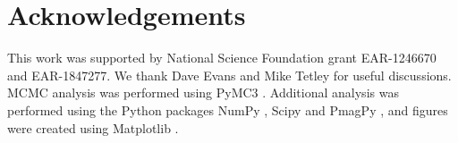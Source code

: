 \documentclass[11pt,letterpaper]{article}
\begin{document}



\section*{Acknowledgements}
\label{sec:acknowledgements}
This work was supported by National Science Foundation grant EAR-1246670 and EAR-1847277. We thank Dave Evans and Mike Tetley for useful discussions. MCMC analysis was performed using PyMC3 \citep{Salvatier2016a}. Additional analysis was performed using the Python packages NumPy \citep{Harris2020a}, Scipy \citep{Virtanen2020a} and PmagPy \citep{Tauxe2016a}, and figures were created using Matplotlib \citep{Hunter2007a}.

\clearpage
\newpage
\footnotesize

\singlespacing



\end{document}
